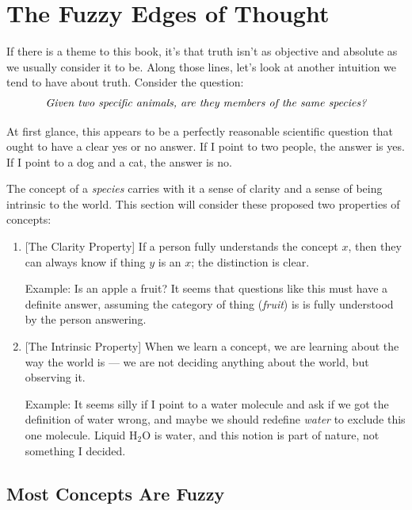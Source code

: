 \documentclass[9pt, twoside]{book}
\theoremstyle{argtstyle}
\begin{document}
\chapter{The Fuzzy Edges of Thought}

If there is a theme to this book, it's that truth isn't as
objective and absolute as we usually consider it to be.
Along those lines, let's
look at another intuition we tend to have about truth.
Consider the question:
\begin{equation*}\label{eq4}
    \text{\em Given two specific animals, are they members of the same
    species?}
\end{equation*}

At first glance, this appears to be a perfectly reasonable scientific question
that ought to have a clear yes or no answer. If I point to two people, the
answer is yes. If I point to a dog and a cat, the answer is no.

The concept of a {\em species} carries with it a sense of clarity and a
sense of being intrinsic to the world.
This section will consider
these proposed two properties of concepts:
\begin{enumerate}
    \item{} [The Clarity Property]
        If a person fully understands the concept $x$,
        then they can always know if thing $y$ is an $x$;
        the distinction is clear.

        Example: Is an apple a fruit? It seems that questions like this must
        have a definite answer, assuming the category of thing ({\em fruit}) is
        is fully understood by the person answering.
    \item{} [The Intrinsic Property]
        When we learn a concept, we are learning about the way the world
        is --- we are not deciding anything about the world, but observing it.

        Example: It seems silly if I point to a water molecule and ask if we got
        the definition of water wrong, and maybe we should redefine {\em water}
        to exclude this one molecule.
        Liquid H$_2$O is water, and this notion is part
        of nature, not something I decided.
\end{enumerate}


\section{Most Concepts Are Fuzzy}
\end{document}
